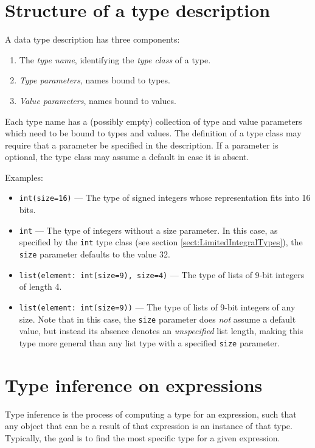 \section{Structure of a type description}

A data type description has three components:
\begin{enumerate}
\item The {\em type name}, identifying the {\em type class} of a type.
\item {\em Type parameters}, names bound to types.
\item {\em Value parameters}, names bound to values.
\end{enumerate}

Each type name has a (possibly empty) collection of type and value
parameters which need to be bound to types and values. The definition
of a type class may require that a parameter be specified in the
description. If a parameter is optional, the type class may assume a
default in case it is absent.

Examples:
\begin{itemize}
\item {\tt int(size=16)} --- The type of signed integers whose
  representation fits into 16 bits.
\item {\tt int} --- The type of integers without a size parameter. In
  this case, as specified by the {\tt int} type class (see section
  \ref{sect:LimitedIntegralTypes}), the {\tt size} parameter defaults
  to the value 32.
\item {\tt list(element: int(size=9), size=4)} --- The type of lists
  of 9-bit integers of length 4.
\item {\tt list(element: int(size=9))} --- The type of lists of 9-bit
  integers of any size. Note that in this case, the {\tt size}
  parameter does {\em not} assume a default value, but instead its
  absence denotes an {\em unspecified} list length, making this type
  more general than any list type with a specified {\tt size}
  parameter.
\end{itemize}


\section{Type inference on expressions}

Type inference is the process of computing a type for an expression,
such that any object that can be a result of that expression is an
instance of that type. Typically, the goal is to find the most
specific type for a given expression. 

